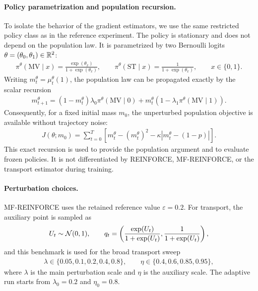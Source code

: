 \paragraph{Policy parametrization and population recursion.}
To isolate the behavior of the gradient estimators, we use the same restricted policy class as in the reference experiment. The policy is stationary and does not depend on the population law. It is parametrized by two Bernoulli logits $\theta=(\theta_0,\theta_1)\in\mathbb{R}^2$:
\begin{align}
    \pi^\theta(\mathrm{MV}\mid x)
    =
    \frac{\exp(\theta_x)}{1+\exp(\theta_x)},
    \qquad
    \pi^\theta(\mathrm{ST}\mid x)
    =
    \frac{1}{1+\exp(\theta_x)},
    \qquad x\in\{0,1\}.
\end{align}
Writing $m_t^\theta=\mu_t^\theta(1)$, the population law can be propagated exactly by the scalar recursion
\begin{align}
    m_{t+1}^\theta
    =
    (1-m_t^\theta)\lambda_0\pi^\theta(\mathrm{MV}\mid 0)
    +
    m_t^\theta\left(1-\lambda_1\pi^\theta(\mathrm{MV}\mid 1)\right).
    \label{eq:twostate-population-recursion}
\end{align}
Consequently, for a fixed initial mass $m_0$, the unperturbed population objective is available without trajectory noise:
\begin{align}
    J(\theta;m_0)
    =
    \sum_{t=0}^{T}
    \left[
        m_t^\theta
        -
        (m_t^\theta)^2
        -
        \kappa\left|m_t^\theta-(1-p)\right|
    \right].
    \label{eq:twostate-objective}
\end{align}
This exact recursion is used to provide the population argument and to evaluate frozen policies. It is not differentiated by REINFORCE, MF-REINFORCE, or the transport estimator during training.

\paragraph{Perturbation choices.}
MF-REINFORCE uses the retained reference value $\varepsilon=0.2$. For transport, the auxiliary point is sampled as
\begin{align}
    U_t\sim{\cal N}(0,1),
    \qquad
    q_t
    =
    \left(
        \frac{\exp(U_t)}{1+\exp(U_t)},
        \frac{1}{1+\exp(U_t)}
    \right),
\end{align}
and this benchmark is used for the broad transport sweep
\begin{align}
    \lambda\in\{0.05,0.1,0.2,0.4,0.8\},
    \qquad
    \eta\in\{0.4,0.6,0.85,0.95\},
\end{align}
where $\lambda$ is the main perturbation scale and $\eta$ is the auxiliary scale. The adaptive run starts from $\lambda_0=0.2$ and $\eta_0=0.8$.

